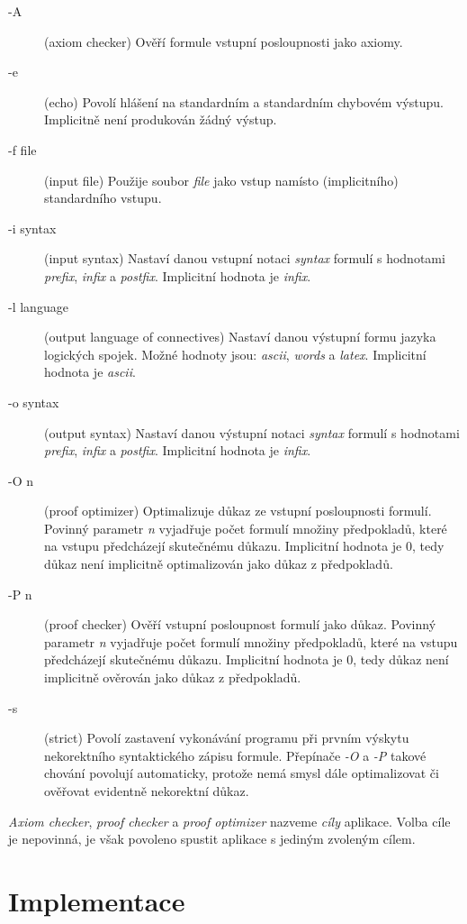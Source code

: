 \documentclass[thesis=B,czech,hidelinks]{thesis}[2012/06/26]
\begin{document}
\begin{description}
	\item[-A] (axiom checker) Ověří formule vstupní posloupnosti jako axiomy.
	\item[-e] (echo) Povolí hlášení na standardním a standardním chybovém výstupu. Implicitně není produkován žádný výstup.
	\item[-f file] (input file) Použije soubor \emph{file} jako vstup namísto (implicitního) standardního vstupu.
	\item[-i syntax] (input syntax) Nastaví danou vstupní notaci \emph{syntax} formulí s hodnotami \emph{prefix}, \emph{infix} a \emph{postfix}. Implicitní hodnota je \emph{infix}.
	\item[-l language] (output language of connectives) Nastaví danou výstupní formu jazyka logických spojek. Možné hodnoty jsou: \emph{ascii}, \emph{words} a \emph{latex}. Implicitní hodnota je \emph{ascii}.
	\item[-o syntax] (output syntax) Nastaví danou výstupní notaci \emph{syntax} formulí s hodnotami \emph{prefix}, \emph{infix} a \emph{postfix}. Implicitní hodnota je \emph{infix}.
	\item[-O n] (proof optimizer) Optimalizuje důkaz ze vstupní posloupnosti formulí. Povinný parametr \emph{n} vyjadřuje počet formulí množiny předpokladů, které na vstupu předcházejí skutečnému důkazu. Implicitní hodnota je 0, tedy důkaz není implicitně optimalizován jako důkaz z předpokladů.
	\item[-P n] (proof checker) Ověří vstupní posloupnost formulí jako důkaz. Povinný parametr \emph{n} vyjadřuje počet formulí množiny předpokladů, které na vstupu předcházejí skutečnému důkazu. Implicitní hodnota je 0, tedy důkaz není implicitně ověrován jako důkaz z předpokladů.
	\item[-s] (strict) Povolí zastavení vykonávání programu při prvním výskytu nekorektního syntaktického zápisu formule. Přepínače \emph{-O} a \emph{-P} takové chování povolují automaticky, protože nemá smysl dále optimalizovat či ověřovat evidentně nekorektní důkaz.
\end{description}

\emph{Axiom checker}, \emph{proof checker} a \emph{proof optimizer} nazveme \emph{cíly} aplikace. Volba cíle je nepovinná, je však povoleno spustit aplikace s jediným zvoleným cílem.

%
%
%

\chapter{Implementace}
\end{document}
